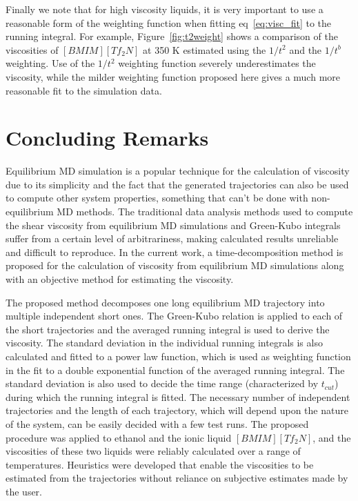 \documentclass[12pt]{article}
\begin{document}
Finally we note that for high viscosity liquids, it is very important to use a reasonable form of the weighting function when fitting eq~\ref{eq:visc_fit} to the running integral. For example, Figure~\ref{fig:t2weight} shows a comparison of the viscosities of $[BMIM][Tf_2N]$ at 350 K estimated using the  $1/t^2$  and the $1/t^b$ weighting. Use of the $1/t^2$ weighting function severely underestimates the viscosity, while the milder weighting function proposed here gives a much more reasonable fit to the simulation data. 

\section{Concluding Remarks}

Equilibrium MD simulation is a popular technique 
for the calculation of viscosity due to its simplicity
and the fact that the generated trajectories can also be used to compute other system properties,
something that can't be done with non-equilibrium MD methods.
The traditional data analysis methods used to compute the shear viscosity from equilibrium MD simulations and Green-Kubo integrals 
suffer from a certain level of arbitrariness,
making calculated results unreliable and difficult to reproduce. In the current work,
a time-decomposition method is proposed for the calculation of viscosity from equilibrium MD simulations along with an objective method for estimating the viscosity.

The proposed method decomposes one long equilibrium MD trajectory into multiple independent short ones.
The Green-Kubo relation is applied to each of the short trajectories
and the averaged running integral is used to derive the viscosity.
The standard deviation in the individual running integrals is also calculated and fitted to a power law function,
which is used as weighting function in the fit to a double exponential function of the averaged running integral.
The standard deviation is also used to decide the time range (characterized by $t_{cut}$) 
during which the running integral is fitted.
The necessary number of independent trajectories and the length of each trajectory, which will depend upon the nature of the system, can be easily decided with a few test runs.
The proposed procedure was applied to ethanol and the ionic liquid $[BMIM][Tf_2N]$,
and the viscosities of these two liquids were reliably calculated over a range of temperatures. Heuristics were developed that enable the viscosities to be estimated from the trajectories without reliance on subjective estimates made by the user. 
\end{document}
